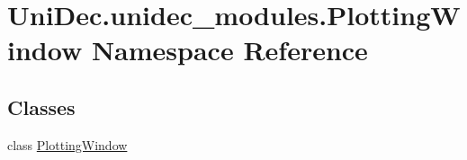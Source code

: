 \hypertarget{namespace_uni_dec_1_1unidec__modules_1_1_plotting_window}{}\section{Uni\+Dec.\+unidec\+\_\+modules.\+Plotting\+Window Namespace Reference}
\label{namespace_uni_dec_1_1unidec__modules_1_1_plotting_window}
\subsection*{Classes}
\begin{DoxyCompactItemize}
\item 
class \hyperlink{class_uni_dec_1_1unidec__modules_1_1_plotting_window_1_1_plotting_window}{Plotting\+Window}
\end{DoxyCompactItemize}
